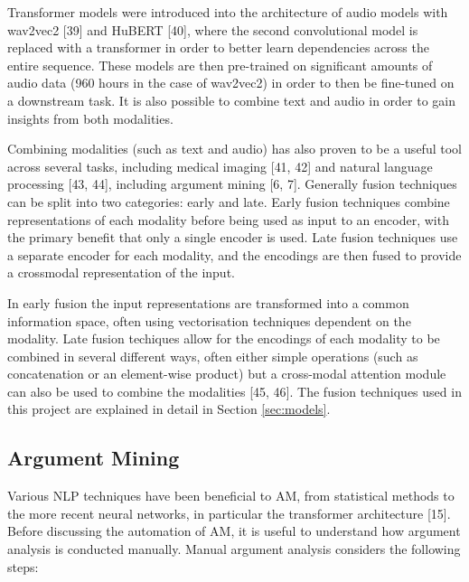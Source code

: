 \documentclass[twocolumn,twoside]{article}
\begin{document}
Transformer models were introduced into the architecture of audio models
with wav2vec2 {[}39{]} and HuBERT {[}40{]}, where the second
convolutional model is replaced with a transformer in order to better
learn dependencies across the entire sequence. These models are then
pre-trained on significant amounts of audio data (960 hours in the case
of wav2vec2) in order to then be fine-tuned on a downstream task. It is
also possible to combine text and audio in order to gain insights from
both modalities.

Combining modalities (such as text and audio) has also proven to be a
useful tool across several tasks, including medical imaging {[}41, 42{]} and natural language processing {[}43, 44{]}, including
argument mining {[}6, 7{]}. Generally fusion techniques can be
split into two categories: early and late. Early fusion techniques
combine representations of each modality before being used as input to
an encoder, with the primary benefit that only a single encoder is used.
Late fusion techniques use a separate encoder for each modality, and the
encodings are then fused to provide a crossmodal representation of the
input.

In early fusion the input representations are transformed into a common
information space, often using vectorisation techniques dependent on the
modality. Late fusion techiques allow for the encodings of each modality
to be combined in several different ways, often either simple operations
(such as concatenation or an element-wise product) but a cross-modal
attention module can also be used to combine the modalities {[}45, 46{]}. The fusion techniques used in this project are explained in
detail in Section \ref{sec:models}.

\subsection{Argument Mining}\label{argument-mining}

Various NLP techniques have been beneficial to AM, from statistical
methods to the more recent neural networks, in particular the
transformer architecture {[}15{]}. Before discussing the automation of
AM, it is useful to understand how argument analysis is conducted
manually. Manual argument analysis considers the following steps:
\end{document}
